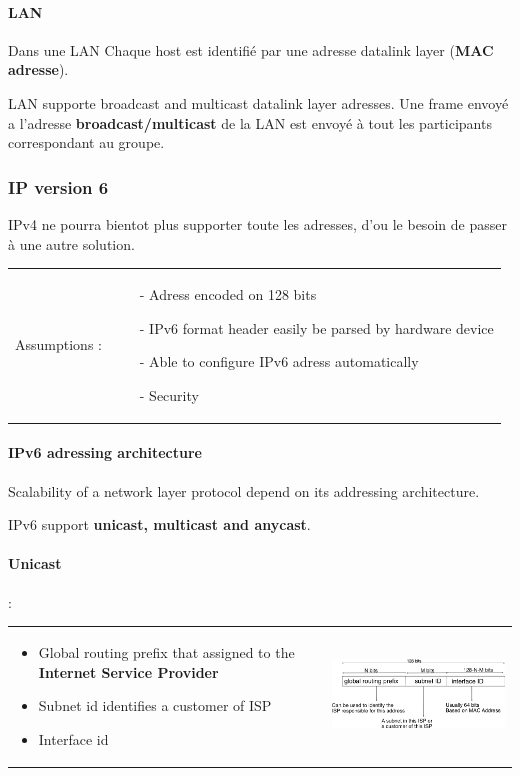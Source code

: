 \paragraph{LAN} Dans une LAN Chaque host est identifié par une adresse datalink layer
(\textbf{MAC adresse}).

LAN supporte broadcast and multicast datalink layer adresses. Une frame envoyé a l'adresse
\textbf{broadcast/multicast} de la LAN est envoyé à tout les participants correspondant
au groupe.

\subsubsection{IP version 6}
IPv4 ne pourra bientot plus supporter toute les adresses, d'ou le besoin
de passer à une autre solution.

\begin{tabular}{m{2.5cm}m{10cm}}
    Assumptions : &
    \begin{itemize}
        \item[-] Adress encoded on 128 bits
        \item[-] IPv6 format header easily be parsed by hardware device
        \item[-] Able to configure IPv6 adress automatically
        \item[-] Security
    \end{itemize}
\end{tabular}
    
\paragraph{IPv6 adressing architecture}
Scalability of a network layer protocol depend on its addressing architecture.

IPv6 support \textbf{unicast, multicast and anycast}.

\paragraph{\textbf{Unicast}} :

\begin{tabular}{m{8cm}m{7cm}}
    \begin{itemize}
        \item Global routing prefix that assigned to the \textbf{Internet Service Provider}
        \item Subnet id identifies a customer of ISP
        \item Interface id
    \end{itemize}
    &
    \includegraphics[width=8cm]{unicast.png}
\end{tabular}


